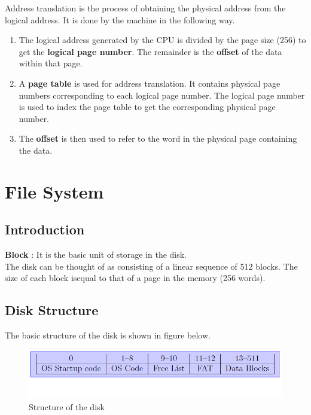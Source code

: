 \documentclass[11pt]{article}
\begin{document}
Address translation is the process of obtaining the physical address from the logical address. It is done by the machine in the following way. 
\begin{enumerate}
\item The logical address generated by the CPU is divided by the page size (256) to get the \textbf{logical page number}. The remainder is the \textbf{offset} of the data within that page.


\item A \textbf{page table} is used for address translation. It contains physical page numbers corresponding to each logical page number. The logical page number is used to index the page table to get the corresponding physical page number.

\item The \textbf{offset} is then used to refer to the word in the physical page containing the data.
\end{enumerate}






\section{File System}
\subsection{Introduction}

\textbf{Block} : It is the basic unit of storage in the disk.\\
The disk can be thought of as consisting of a linear sequence of 512 blocks. The size of each block isequal to that of a page in the memory (256 words).

\subsection{Disk Structure}
The basic structure of the disk is shown in figure below.

\begin{figure}[hbtp]
\begin{center}
\includegraphics[scale=0.5]{fileblockdiagram.png}
\end{center}
\caption{Structure of the disk}
\end{figure}
\end{document}
